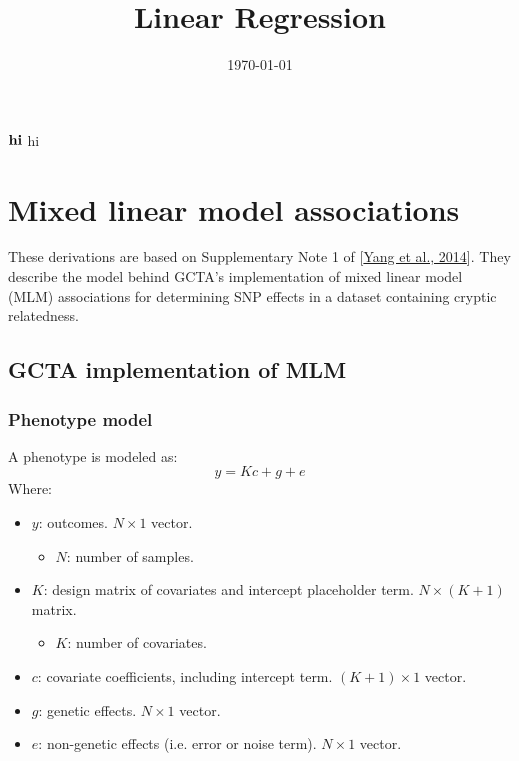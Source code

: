 \documentclass[12pt]{article}
\title{Linear Regression}
\date{\today}
\begin{document}
\maketitle

$\mathbf{hi}$ hi

\section{Mixed linear model associations}

These derivations are based on Supplementary Note 1 of [\href{https://www.nature.com/articles/ng.2876}{Yang et al., 2014}]. They describe the model behind GCTA's implementation of mixed linear model (MLM) associations for determining SNP effects in a dataset containing cryptic relatedness.

\subsection{GCTA implementation of MLM}

\subsubsection{Phenotype model}
A phenotype is modeled as:
$$ y = Kc + g + e $$
Where:
\begin{itemize}
    \item $y$: outcomes.
    $N \times 1$ vector.
    \begin{itemize}
        \item $N$: number of samples.
    \end{itemize}
    \item $K$: design matrix of covariates and intercept placeholder term.
    $N \times (K+1)$ matrix.
    \begin{itemize}
        \item $K$: number of covariates.
    \end{itemize}
    \item $c$: covariate coefficients, including intercept term.
    $(K+1) \times 1$ vector.
    \item $g$: genetic effects.
    $N \times 1$ vector.
    \item $e$: non-genetic effects (i.e. error or noise term).
    $N \times 1$ vector.
\end{itemize}
\end{document}

